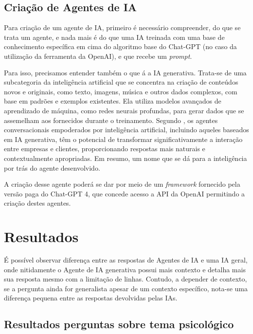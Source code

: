 \documentclass{article}
\begin{document}
\subsection{Criação de Agentes de IA}

\hspace{0.5cm}Para criação de um agente de IA, primeiro é necessário compreender, do que se trata um agente, e nada mais é do que uma IA treinada com uma base de conhecimento específica em cima do algoritmo base do Chat-GPT (no caso da utilização da ferramenta da OpenAI), e que recebe um \textit{prompt}.

Para isso, precisamos entender também o que á a IA generativa. Trata-se de uma subcategoria da inteligência artificial que se concentra na criação de conteúdos novos e originais, como texto, imagens, música e outros dados complexos, com base em padrões e exemplos existentes. Ela utiliza modelos avançados de aprendizado de máquina, como redes neurais profundas, para gerar dados que se assemelham aos fornecidos durante o treinamento. Segundo \cite{Mariani2023}, os agentes conversacionais empoderados por inteligência artificial, incluindo aqueles baseados em IA generativa, têm o potencial de transformar significativamente a interação entre empresas e clientes, proporcionando respostas mais naturais e contextualmente apropriadas. Em resumo, um nome que se dá para a inteligência por trás do agente desenvolvido.

A criação desse agente poderá se dar por meio de um \textit{framework} fornecido pela versão paga do Chat-GPT 4, que concede acesso a API da OpenAI permitindo a criação destes agentes.

\section{Resultados}

\hspace{0.5cm}É possível observar diferença entre as respostas de Agentes de IA e uma IA geral, onde nitidamente o Agente de IA generativa possui mais contexto e detalha mais sua resposta mesmo com a limitação de linhas. Contudo, a depender de contexto, se a pergunta ainda for generalista apesar de um contexto específico, nota-se uma diferença pequena entre as respostas devolvidas pelas IAs.

\subsection{Resultados perguntas sobre tema psicológico}
\end{document}
